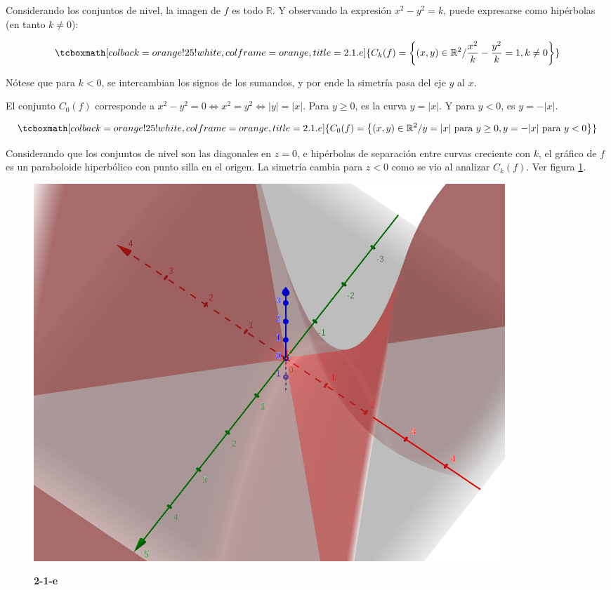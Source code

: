 \documentclass{article}
\renewcommand{\Bbb}{\mathbb}
\begin{document}
Considerando los conjuntos de nivel, la imagen de $f$ es todo $\Bbb R$. Y observando la expresión $x^2 - y^2 = k$, puede expresarse como hipérbolas (en tanto $k \neq 0$):

\begin{equation}
\tcboxmath[colback=orange!25!white,colframe=orange,title=2.1.e]
{ C_k(f) = \left\{ (x,y) \in \Bbb R^2 / \frac{x^2}{k} - \frac{y^2}{k} = 1, k \neq 0 \right\} }
\end{equation}

Nótese que para $k < 0$, se intercambian los signos de los sumandos, y por ende la simetría pasa del eje $y$ al $x$. 

El conjunto $C_0(f)$ corresponde a $x^2 - y^2 = 0 \Leftrightarrow x^2 = y^2 \Leftrightarrow |y| = |x|$. Para $y \geq 0$, es la curva $y = |x|$. Y para $y < 0$, es $y = -|x|$.

\begin{equation}
\tcboxmath[colback=orange!25!white,colframe=orange,title=2.1.e]
{ C_0(f) = \left\{ (x,y) \in \Bbb R^2 / y = |x| \text{ para } y \geq 0, y = -|x| \text{ para } y < 0 \right\} }
\end{equation}

Considerando que los conjuntos de nivel son las diagonales en $z = 0$, e hipérbolas de separación entre curvas creciente con $k$, el gráfico de $f$ es un paraboloide hiperbólico con punto silla en el origen. La simetría cambia para $z < 0$ como se vio al analizar $C_k(f)$. Ver figura \ref{fig:2-1-e}.

\begin{figure}[ht]
\caption{\textbf{2-1-e}}
\includegraphics[scale=0.4]{img/ejercicios/2/1-e.png} 
\centering
\label{fig:2-1-e}
\end{figure}
\end{document}

